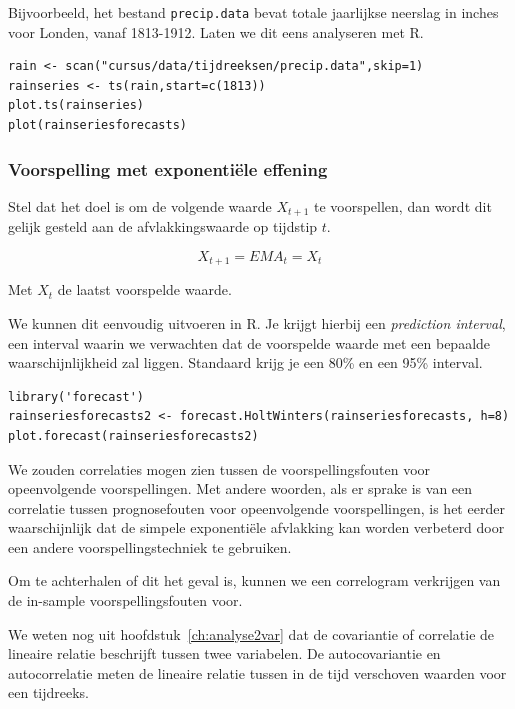 Bijvoorbeeld, het bestand \texttt{precip.data} bevat totale jaarlijkse neerslag in inches voor Londen, vanaf 1813-1912. Laten we dit eens analyseren met R.

\begin{lstlisting}
rain <- scan("cursus/data/tijdreeksen/precip.data",skip=1)
rainseries <- ts(rain,start=c(1813))
plot.ts(rainseries)
plot(rainseriesforecasts)
\end{lstlisting} 


\subsubsection{Voorspelling met exponentiële effening}

Stel dat het doel is om de volgende waarde $X_{t+1}$ te voorspellen, dan wordt dit gelijk gesteld aan de afvlakkingswaarde op tijdstip $t$.

\begin{equation}
	X_{t+1} = EMA_t = X_t
	\label{eq:EMA}
\end{equation}

Met $X_t$ de laatst voorspelde waarde. 

We kunnen dit eenvoudig uitvoeren in R. Je krijgt hierbij een \emph{prediction interval}, een interval waarin we verwachten dat de voorspelde waarde met een bepaalde waarschijnlijkheid zal liggen. Standaard krijg je een 80\% en een 95\% interval.

\begin{lstlisting} 
library('forecast')
rainseriesforecasts2 <- forecast.HoltWinters(rainseriesforecasts, h=8)
plot.forecast(rainseriesforecasts2)
\end{lstlisting} 

We zouden correlaties mogen zien tussen de voorspellingsfouten voor opeenvolgende voorspellingen. Met andere woorden, als er sprake is van een correlatie tussen prognosefouten voor opeenvolgende voorspellingen, is het eerder waarschijnlijk dat de simpele exponentiële afvlakking kan worden verbeterd door een andere voorspellingstechniek te gebruiken.

Om te achterhalen of dit het geval is, kunnen we een correlogram verkrijgen van de in-sample voorspellingsfouten voor.

We weten nog uit hoofdstuk~\ref{ch:analyse2var} dat de covariantie of correlatie de lineaire relatie beschrijft tussen twee variabelen. De autocovariantie en autocorrelatie meten de lineaire relatie tussen in de tijd verschoven waarden voor een tijdreeks.

